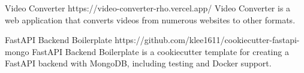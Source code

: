 

\cvproject
    {
        Video Converter
    }
    {https://video-converter-rho.vercel.app/}
    {
        Video Converter is a web application that converts videos from numerous websites
        to other formats.
    }

\cvproject
    {FastAPI Backend Boilerplate}
    {https://github.com/klee1611/cookiecutter-fastapi-mongo}
    {
        FastAPI Backend Boilerplate is a cookiecutter template for creating a FastAPI
        backend with MongoDB, including testing and Docker support.
    }

